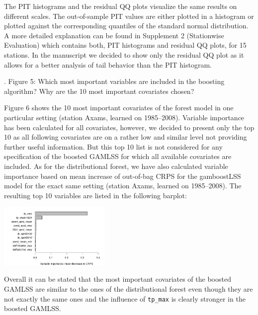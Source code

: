 \documentclass[american,foldmarks=false,noconfig]{uibklttr}
\newenvironment{review}{\fontshape{\itdefault}\fontseries{\bfdefault} \selectfont \smallskip}{\par}
\begin{document}
The PIT histograms and the residual QQ plots visualize the same
results on different scales. The out-of-sample PIT values are 
either plotted in a histogram or plotted against the corresponding
quantiles of the standard normal distribution. A more detailed 
explanation can be found in Supplement 2 (Stationwise Evaluation) 
which contains both, PIT histograms and residual QQ plots, 
for 15 stations. In the manuscript we decided to show only the 
residual QQ plot as it allows for a better analysis of tail 
behavior than the PIT histogram.


\begin{review}
4. Figure 5: Which most important variables are included in the 
boosting algorithm? Why are the 10 most important covariates chosen?
\end{review}

Figure 6 shows the 10 most important covariates of the forest model
in one particular setting (station Axams, learned on 1985--2008). 
Variable importance has been calculated for all covariates, however,
we decided to present only the top 10 as all following covariates 
are on a rather low and similar level not providing further useful
information. But this top 10 list is not considered for any 
specification of the boosted GAMLSS for which all available 
covariates are included. As for the distributional forest, 
we have also calculated variable importance based on mean increase 
of out-of-bag CRPS for the gamboostLSS model for the exact same 
setting (station Axams, learned on 1985--2008). The resulting 
top 10 variables are listed in the following barplot:

\begin{center}
\includegraphics[width = 0.4\textwidth]{varimp_gb.jpeg}
\end{center}

Overall it can be stated that the most important covariates of the boosted 
GAMLSS are similar to the ones of the distributional forest even though they
are not exactly the same ones and the influence of \texttt{tp\_max} is clearly
stronger in the boosted GAMLSS.


\end{document}
